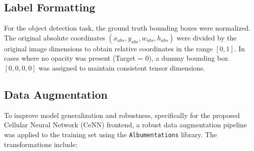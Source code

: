 \documentclass[a4paper,fleqn]{cas-dc}
\begin{document}
\subsection{Label Formatting}
For the object detection task, the ground truth bounding boxes were normalized. The original absolute coordinates $(x_{abs}, y_{abs}, w_{abs}, h_{abs})$ were divided by the original image dimensions to obtain relative coordinates in the range $[0, 1]$. In cases where no opacity was present (Target = 0), a dummy bounding box $[0, 0, 0, 0]$ was assigned to maintain consistent tensor dimensions.

\subsection{Data Augmentation}
To improve model generalization and robustness, specifically for the proposed Cellular Neural Network (CeNN) frontend, a robust data augmentation pipeline was applied to the training set using the \texttt{Albumentations}\cite{albumentations} library. The transformations include:
\end{document}
